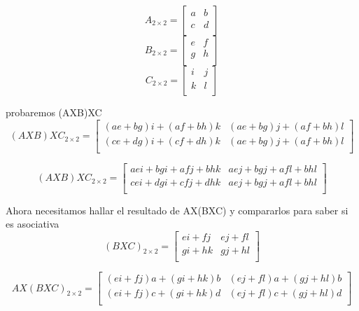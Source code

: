 \documentclass{article}
\begin{document}
\[
  A_{2\times 2} =
  \left[ {\begin{array}{cc}
    a & b \\
    c & d  \\
  
  \end{array} } \right]
\]
\[
  B_{2\times 2} =
  \left[ {\begin{array}{cc}
    e & f  \\
    g & h  \\
   
  \end{array} } \right]
\]
\[
  C_{2\times 2} =
  \left[ {\begin{array}{cc}
    i & j  \\
    k & l  \\
    
  \end{array} } \right]
\]

probaremos (AXB)XC
\[
  (AXB)XC_{2\times 2} =
  \left[ {\begin{array}{cc}
    (ae+bg)i+(af+bh)k & (ae+bg)j+(af+bh)l\\
    (ce+dg)i+(cf+dh)k & (ae+bg)j+(af+bh)l  \\
  
  \end{array} } \right]
\]

\[
  (AXB)XC_{2\times 2} =
  \left[ {\begin{array}{cc}
    aei+bgi+afj+bhk & aej+bgj+afl+bhl\\
    cei+dgi+cfj+dhk & aej+bgj+afl+bhl  \\
  
  \end{array} } \right]
\]

Ahora necesitamos hallar el resultado de AX(BXC) y compararlos para saber si es asociativa
\[
  (BXC)_{2\times 2} =
  \left[ {\begin{array}{cc}
    ei + fj & ej + fl \\
    gi + hk & gj + hl  \\
  
  \end{array} } \right]
\]

\[
  AX(BXC)_{2\times 2} =
  \left[ {\begin{array}{cc}
    (ei + fj)a + (gi + hk)b & (ej + fl)a +(gj + hl)b\\
    (ei + fj)c + (gi + hk)d & (ej + fl)c +(gj + hl)d\\
  
  \end{array} } \right]
\]
\end{document}
